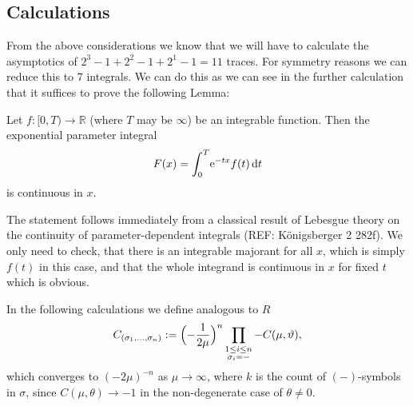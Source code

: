 \subsection{Calculations}
From the above considerations we know that we will have to calculate the
asymptotics of $2^3 - 1 + 2^2 - 1 + 2^1 - 1 = 11$ traces. For symmetry reasons
we can reduce this to 7 integrals. We can do this as we can see in the further
calculation that it suffices to prove the following Lemma:
\begin{Lemma}
  Let $f\colon [0,T)\to\mathbb{R}$ (where $T$ may be $\infty$) be an integrable
  function. Then the exponential parameter integral
  \begin{align*}
    F(x) = \Integ[T]{0}{t}{\Eto{-tx} f(t)}
  \end{align*}
  is continuous in $x$.
  \begin{Proof}
    The statement follows immediately from a classical result of Lebesgue theory
    on the continuity of parameter-dependent integrals (REF: Königsberger 2
    282f). We only need to check, that there is an integrable majorant for all
    $x$, which is simply $f(t)$ in this case, and that the whole integrand is
    continuous in $x$ for fixed $t$ which is obvious.
  \end{Proof}
\end{Lemma}

In the following calculations we define analogous to $R$
\begin{align}
  C_{(\sigma_1,\ldots,\sigma_n)} := \Bigl(-\frac{1}{2\mu}\Bigr)^n
                                    \prod_{
                                      \substack{
                                        1\le i \le n \\
                                        \sigma_i = -
                                    }} -C(\mu,\theta),
\end{align}
which converges to $(-2\mu)^{-n}$ as $\mu\to\infty$, where $k$ is the count
of $(-)$-symbols in $\sigma$, since $C(\mu,\theta)\to -1$ in the non-degenerate
case of $\theta \neq 0$.

